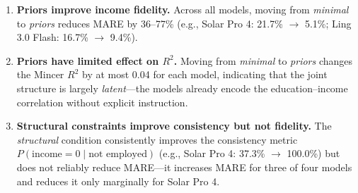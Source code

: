 \documentclass[11pt]{article}
\begin{document}
\begin{enumerate}[leftmargin=*, itemsep=2pt]
  \item \textbf{Priors improve income fidelity.} Across all models, moving from \emph{minimal} to \emph{priors} reduces MARE by 36--77\% (e.g., Solar Pro 4: 21.7\% $\to$ 5.1\%; Ling 3.0 Flash: 16.7\% $\to$ 9.4\%).
  \item \textbf{Priors have limited effect on $R^2$.} Moving from \emph{minimal} to \emph{priors} changes the Mincer $R^2$ by at most 0.04 for each model, indicating that the joint structure is largely \emph{latent}---the models already encode the education--income correlation without explicit instruction.
  \item \textbf{Structural constraints improve consistency but not fidelity.} The \emph{structural} condition consistently improves the consistency metric $P(\text{income}=0 \mid \text{not employed})$ (e.g., Solar Pro 4: 37.3\% $\to$ 100.0\%) but does not reliably reduce MARE---it increases MARE for three of four models and reduces it only marginally for Solar Pro 4.
\end{enumerate}
\end{document}
